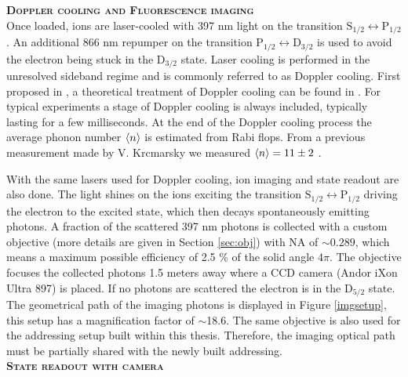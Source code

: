 \textbf{\textsc{Doppler cooling and Fluorescence imaging}}\\
Once loaded, ions are laser-cooled with 397 nm light on the transition $\text{S}_{1/2} \leftrightarrow \text{P}_{1/2}$. An additional 866 nm repumper on the transition $\text{P}_{1/2} \leftrightarrow \text{D}_{3/2}$ is used to avoid the electron being stuck in the $\text{D}_{3/2}$ state. Laser cooling is performed in the unresolved sideband regime \cite{ross} and is commonly referred to as Doppler cooling. First proposed in \cite{Dopplercooling}, a theoretical treatment of Doppler cooling can be found in \cite{RevModPhys.58.699}. For typical experiments a stage of Doppler cooling is always included, typically lasting for a few milliseconds. At the end of the Doppler cooling process the average phonon number $\braket{n}$ is estimated from Rabi flops. From a previous measurement made by V. Krcmarsky we measured $ \braket{n} = 11\pm2$ .\par
With the same lasers used for Doppler cooling, ion imaging and state readout are also done. The light shines on the ions exciting the transition $\text{S}_{1/2} \leftrightarrow \text{P}_{1/2}$ driving the electron to the excited state, which then decays spontaneously emitting photons. A fraction of the scattered 397 nm photons is collected with a custom objective (more details are given in Section \ref{sec:obj}) with NA of $\sim 0.289$, which means a maximum possible efficiency of 2.5 \% of the solid angle $4\pi$. The objective focuses the collected photons 1.5 meters away where a CCD camera (Andor iXon Ultra 897) is placed. If no photons are scattered the electron is in the $\text{D}_{5/2}$ state. The geometrical path of the imaging photons is displayed in Figure \ref{imgsetup}, this setup has a magnification factor of $\sim$18.6. The same objective is also used for the addressing setup built within this thesis. Therefore, the imaging optical path must be partially shared with the newly built addressing.\vspace{.5em}\\
\textbf{\textsc{State readout with camera}}\\
